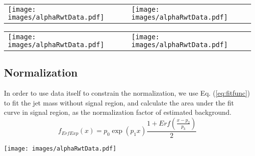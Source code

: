 \documentclass[a0,portrait]{a0poster}
\begin{document}
\begin{center}
\begin{multicols}{2}
\begin{textbox2}
      \begin{center}
        \begin{tabular}{ll}
          \texttt{[image: images/alphaRwtData.pdf]} &
          \texttt{[image: images/alphaRwtData.pdf]} \\
        \end{tabular}
        \label{fig:zpmass}
      \end{center}

      \begin{center}
        \begin{tabular}{ll}
          \texttt{[image: images/alphaRwtData.pdf]} &
          \texttt{[image: images/alphaRwtData.pdf]} \\
        \end{tabular}
        \label{fig:predbkg}
      \end{center}
      
    \end{textbox2}

    \begin{textbox2}
      \section*{\color{FireBrick} Normalization}
      
      In order to use data itself to constrain the normalization, we use Eq. (\ref{eq:fitfunc}) to fit the jet mass without signal region, and calculate the area under the fit curve in signal region, as the normalization factor of estimated background.
      \vspace{1em}
      \begin{equation} \label{eq:fitfunc}
        f_{ErfExp}(x) = p_0\exp(p_1x)\frac{1+Erf(\frac{x-p_2}{p_3})}{2}
      \end{equation}
      
      \begin{center}
        \texttt{[image: images/alphaRwtData.pdf]}
        \label{fig:prmass}
      \end{center}
    \end{textbox2}
    

\end{multicols}
\end{center}
\end{document}
